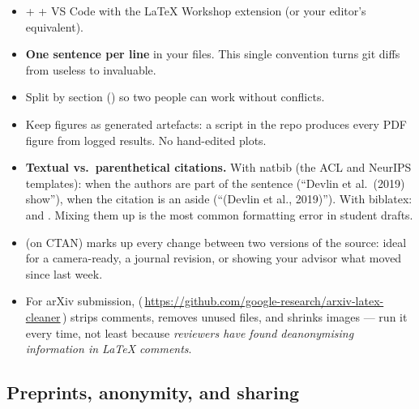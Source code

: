 \documentclass[11pt,a4paper]{article}
\begin{document}
\begin{itemize}
  \item {} +  + VS Code with the LaTeX
        Workshop extension (or your editor's equivalent).
  \item \textbf{One sentence per line} in your  files. This single
        convention turns git diffs from useless to invaluable.
  \item Split by section () so
        two people can work without conflicts.
  \item Keep figures as generated artefacts: a script in the repo produces
        every PDF figure from logged results. No hand-edited plots.
  \item \textbf{Textual vs.\ parenthetical citations.} With natbib (the ACL
        and NeurIPS templates):  when the
        authors are part of the sentence (``Devlin et al.\ (2019) show''),
         when the citation is an aside
        (``(Devlin et al., 2019)''). With biblatex:  and . Mixing them up is the
        most common formatting error in student drafts.
  \item \textbf{} (on CTAN) marks up every change between two
        versions of the source: ideal for a camera-ready, a journal revision,
        or showing your advisor what moved since last week.
  \item For arXiv submission, 
        (\,\url{https://github.com/google-research/arxiv-latex-cleaner}\,)
        strips comments, removes unused files, and shrinks images --- run it
        every time, not least because \emph{reviewers have found deanonymising
        information in LaTeX comments}.
\end{itemize}

\subsection{Preprints, anonymity, and sharing}
\end{document}
